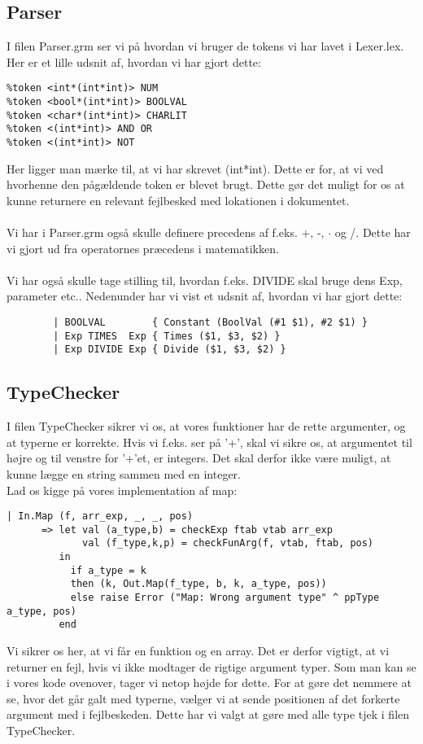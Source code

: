 \documentclass[a4paper]{article}
\begin{document}
\subsection{Parser}
I filen Parser.grm ser vi på hvordan vi bruger de tokens vi har lavet i Lexer.lex. Her er et lille udsnit af, hvordan vi har gjort dette:\\
\begin{lstlisting}
%token <int*(int*int)> NUM
%token <bool*(int*int)> BOOLVAL
%token <char*(int*int)> CHARLIT
%token <(int*int)> AND OR
%token <(int*int)> NOT
\end{lstlisting}
Her ligger man mærke til, at vi har skrevet (int*int). Dette er for, at vi ved hvorhenne den pågældende token er blevet brugt. Dette gør det muligt for os at kunne returnere en relevant fejlbesked med lokationen i dokumentet.\\ \\
Vi har i Parser.grm også skulle definere precedens af f.eks. +, -, $\cdot$ og 
/. Dette har vi gjort ud fra operatornes præcedens i matematikken.\\ \\
Vi har også skulle tage stilling til, hvordan f.eks. DIVIDE skal bruge dens Exp, parameter etc.. Nedenunder har vi vist et udsnit af, hvordan vi har gjort dette:
\begin{lstlisting}
        | BOOLVAL        { Constant (BoolVal (#1 $1), #2 $1) }
        | Exp TIMES  Exp { Times ($1, $3, $2) }
        | Exp DIVIDE Exp { Divide ($1, $3, $2) }
\end{lstlisting}
\subsection{TypeChecker}
I filen TypeChecker sikrer vi os, at vores funktioner har de rette argumenter, og at typerne er korrekte. Hvis vi f.eks. ser på '+', skal vi sikre os, at argumentet til højre og til venstre for '+'et, er integers. Det skal derfor ikke være muligt, at kunne lægge en string sammen med en integer. \\
Lad os kigge på vores implementation af map:
\begin{lstlisting}
| In.Map (f, arr_exp, _, _, pos)
      => let val (a_type,b) = checkExp ftab vtab arr_exp
             val (f_type,k,p) = checkFunArg(f, vtab, ftab, pos)
         in
           if a_type = k
           then (k, Out.Map(f_type, b, k, a_type, pos))
           else raise Error ("Map: Wrong argument type" ^ ppType a_type, pos)
         end
\end{lstlisting}
Vi sikrer os her, at vi får en funktion og en array. Det er derfor vigtigt, at vi returner en fejl, hvis vi ikke modtager de rigtige argument typer. Som man kan se i vores kode ovenover, tager vi netop højde for dette. For at gøre det nemmere at se, hvor det går galt med typerne, vælger vi at sende positionen af det forkerte argument med i fejlbeskeden. 
Dette har vi valgt at gøre med alle type tjek i filen TypeChecker.
\end{document}
